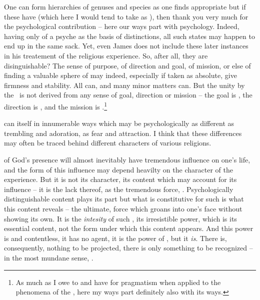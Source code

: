 One can form hierarchies of genuses and species as one finds
appropriate but if these have  (which
here I would tend to take as ),
then thank you very much for the psychological contribution -- here
our ways part with psychology.  Indeed, having only  of a  psyche as the basis of
distinctions, all such states may happen to end up in the same sack. 
Yet, even James does not include these later instances in his
treatement of the religious experience.  So, after all, they are
disinguishable?  The sense of purpose, of direction and goal, of
mission, or else of finding a valuable sphere of  may
indeed, especially if taken as absolute, give firmness and stability. 
All  can, and many minor matters can.  But the unity
 by the \sch\ is not derived from any sense of goal,
direction or mission -- the goal is , the direction is
, and the mission is .\footnote{As much as I owe to and have for pragmatism when
applied to the phenomena of the , here my ways part
definitely also with its ways.}


\subpa {} can  itself in innumerable ways which may
be psychologically as different as trembling and adoration, as fear
and attraction.  I think that these differences may often be traced
behind different  characters of various religions.  

 of God's presence will almost inevitably have
tremendous influence on one's life, and the form of this influence may
depend heavilty on the character of the experience.  But it is not its
character, its content which may account for its influence -- it is
the lack thereof,  as the tremendous force, 
.  Psychologically distinguishable content plays
its part but what is constitutive for such  is what
this content reveals -- the ultimate,  force which groans
into one's face without showing its own.  It is the {\em intesity} of
such , its irresistible power, which is its
essential content, not the form under which this content appears.  And
this power is  and contentless, it has no agent, it is
the power of , but it {\em is}. There is, 
consequently, nothing to be projected, there is only something to be 
recognized -- in the most mundane sense, . 

